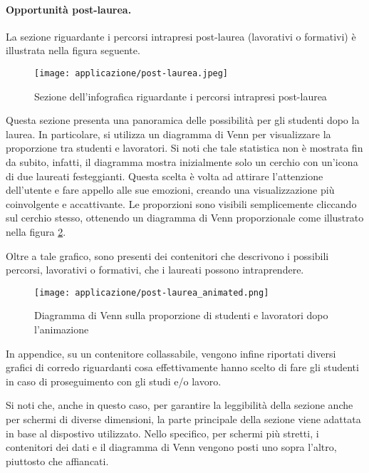 \paragraph{Opportunità post-laurea.} La sezione riguardante i percorsi intrapresi post-laurea (lavorativi o formativi) è illustrata nella figura seguente. 
\begin{figure}[H] 
    \centering 
    \texttt{[image: applicazione/post-laurea.jpeg]} 
    \caption{Sezione dell'infografica riguardante i percorsi intrapresi post-laurea}
    \label{fig:app_post-laurea}
\end{figure}
\noindent Questa sezione presenta una panoramica delle possibilità per gli studenti dopo la laurea. In particolare, si utilizza un diagramma di Venn per visualizzare la 
proporzione tra studenti e lavoratori. 
Si noti che tale statistica non è mostrata fin da subito, infatti, il diagramma mostra inizialmente solo un cerchio con un'icona di due laureati festeggianti.
Questa scelta è volta ad attirare l'attenzione dell'utente e fare appello alle sue emozioni, creando una visualizzazione più coinvolgente e accattivante. 
Le proporzioni sono visibili semplicemente cliccando sul cerchio stesso, ottenendo un diagramma di Venn proporzionale come illustrato nella figura 
\ref{fig:app_post-laurea_animated}. 

Oltre a tale grafico, sono presenti dei contenitori che descrivono i possibili percorsi, lavorativi o formativi, che i laureati possono intraprendere.
\begin{figure}[H] 
    \centering 
    \texttt{[image: applicazione/post-laurea\_animated.png]} 
    \caption{Diagramma di Venn sulla proporzione di studenti e lavoratori dopo l'animazione}
    \label{fig:app_post-laurea_animated}
\end{figure}

In appendice, su un contenitore collassabile, vengono infine riportati diversi grafici di corredo riguardanti cosa effettivamente hanno scelto di fare gli studenti in caso 
di proseguimento con gli studi e/o lavoro.

\bigskip
\noindent Si noti che, anche in questo caso, per garantire la leggibilità della sezione anche per schermi di diverse dimensioni, la parte principale della sezione viene adattata 
in base al dispostivo utilizzato. Nello specifico, per schermi più stretti, i contenitori dei dati e il diagramma di Venn vengono posti uno sopra l'altro, piuttosto che affiancati.

